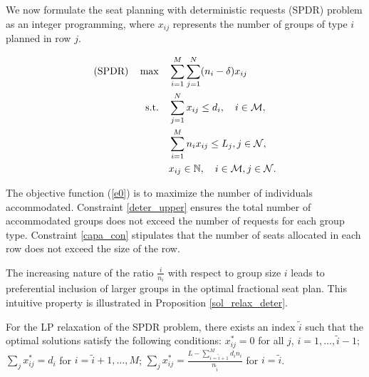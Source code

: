 We now formulate the seat planning with deterministic requests (SPDR) problem as an integer programming, where $x_{ij}$ represents the number of groups of type $i$ planned in row $j$. 

\begin{align}
(\text{SPDR}) \quad \max \quad & \sum_{i=1}^{M}  \sum_{j= 1}^{N} (n_i - \delta) x_{ij} \label{e0} \\
\text {s.t.} \quad & \sum_{j= 1}^{N} x_{ij} \leq d_{i}, \quad i \in \mathcal{M}, \label{deter_upper}\\ 
& \sum_{i=1}^{M} n_{i} x_{ij} \leq L_j, j \in \mathcal{N}, \label{capa_con} \\
& x_{ij} \in \mathbb{N}, \quad i \in \mathcal{M}, j \in \mathcal{N}. \notag 
\end{align}


The objective function (\ref{e0}) is to maximize the number of individuals accommodated. Constraint \eqref{deter_upper} ensures the total number of accommodated groups does not exceed the number of requests for each group type. Constraint \eqref{capa_con} stipulates that the number of seats allocated in each row does not exceed the size of the row.

The increasing nature of the ratio $\frac{i}{n_i}$ with respect to group size $i$ leads to preferential inclusion of larger groups in the optimal fractional seat plan. This intuitive property is illustrated in Proposition \ref{sol_relax_deter}.




\begin{prop}\label{sol_relax_deter}
For the LP relaxation of the \textup{SPDR} problem, there exists an index $\tilde{i}$ such that the optimal solutions satisfy the following conditions: $x_{ij}^{*} = 0$ for all $j$, $i = 1,\ldots, \tilde{i}-1$; $\sum_{j} x_{ij}^{*} = d_{i}$ for $i = \tilde{i}+1,\ldots, M$; $\sum_{j} x_{ij}^{*} = \frac{L - \sum_{i = \tilde{i}+1}^{M} {d_i n_i}}{n_{\tilde{i}}}$ for $i = \tilde{i}$.
\end{prop}

